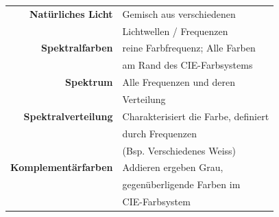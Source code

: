 \begin{tabular}{r|l}
    \textbf{Natürliches Licht}  & Gemisch aus verschiedenen \\
                                & Lichtwellen / Frequenzen \\
    \textbf{Spektralfarben}     & reine Farbfrequenz; Alle Farben \\
                                & am Rand des CIE-Farbsystems \\
    \textbf{Spektrum}           & Alle Frequenzen und deren \\
                                & Verteilung \\
    \textbf{Spektralverteilung} & Charakterisiert die Farbe, definiert \\
                                & durch Frequenzen \\
                                & (Bsp. Verschiedenes Weiss) \\
    \textbf{Komplementärfarben} & Addieren ergeben Grau, \\
                                & gegenüberligende Farben im \\
                                & CIE-Farbsystem
\end{tabular}
